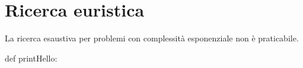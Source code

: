 \chapter{Ricerca euristica}
La ricerca esaustiva per problemi con complessit\`a esponenziale non \`e praticabile.
\begin{python}
	def printHello:
\end{python}
